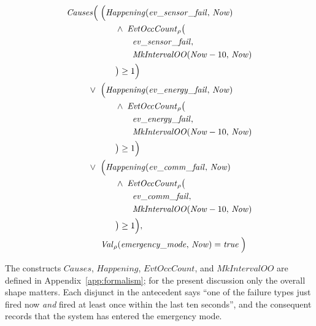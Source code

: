 {\footnotesize
\begin{align*}
    \mathit{Causes}\Bigl(
     & \;\Bigl(\mathit{Happening}(\mathit{ev\_sensor\_fail},\, \mathit{Now})         \\
     & \qquad\land\; \mathit{EvtOccCount}_\rho\bigl(                                 \\
     & \qquad\qquad \mathit{ev\_sensor\_fail},                                       \\
     & \qquad\qquad \mathit{MkIntervalOO}(\mathit{Now} - 10,\, \mathit{Now})         \\
     & \qquad\bigr) \geq 1\Bigr)                                                     \\
    \lor\;
     & \;\Bigl(\mathit{Happening}(\mathit{ev\_energy\_fail},\, \mathit{Now})         \\
     & \qquad\land\; \mathit{EvtOccCount}_\rho\bigl(                                 \\
     & \qquad\qquad \mathit{ev\_energy\_fail},                                       \\
     & \qquad\qquad \mathit{MkIntervalOO}(\mathit{Now} - 10,\, \mathit{Now})         \\
     & \qquad\bigr) \geq 1\Bigr)                                                     \\
    \lor\;
     & \;\Bigl(\mathit{Happening}(\mathit{ev\_comm\_fail},\, \mathit{Now})           \\
     & \qquad\land\; \mathit{EvtOccCount}_\rho\bigl(                                 \\
     & \qquad\qquad \mathit{ev\_comm\_fail},                                         \\
     & \qquad\qquad \mathit{MkIntervalOO}(\mathit{Now} - 10,\, \mathit{Now})         \\
     & \qquad\bigr) \geq 1\Bigr),                                                    \\
     & \;\mathit{Val}_\rho(\mathit{emergency\_mode},\, \mathit{Now}) = \mathit{true}
    \;\Bigr)
\end{align*}
}

The constructs $\mathit{Causes}$, $\mathit{Happening}$, $\mathit{EvtOccCount}$, and $\mathit{MkIntervalOO}$ are defined in Appendix~\ref{app:formalism}; for the present discussion only the overall shape matters. Each disjunct in the antecedent says ``one of the failure types just fired now \emph{and} fired at least once within the last ten seconds'', and the consequent records that the system has entered the emergency mode.

